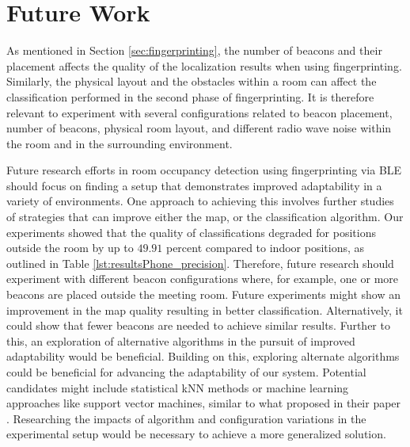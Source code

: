 \chapter{Future Work}
As mentioned in Section \ref{sec:fingerprinting}, the number of beacons and their placement affects the quality of the localization results when using fingerprinting. 
Similarly, the physical layout and the obstacles within a room can affect the classification performed in the second phase of fingerprinting. 
It is therefore relevant to experiment with several configurations related to beacon placement, number of beacons, physical room layout, and different radio wave noise within the room and in the surrounding environment. 

Future research efforts in room occupancy detection using fingerprinting via BLE should focus on finding a setup that demonstrates improved adaptability in a variety of environments.
One approach to achieving this involves further studies of strategies that can improve either the map, or the classification algorithm.
Our experiments showed that the quality of classifications degraded for positions outside the room by up to $49.91$ percent compared to indoor positions, as outlined in Table \ref{lst:resultsPhone_precision}. Therefore, future research should experiment with different beacon configurations where, for example, one or more beacons are placed outside the meeting room. 
Future experiments might show an improvement in the map quality resulting in better classification. Alternatively, it could show that fewer beacons are needed to achieve similar results. 
Further to this, an exploration of alternative algorithms in the pursuit of improved adaptability would be beneficial.
Building on this, exploring alternate algorithms could be beneficial for advancing the adaptability of our system.
Potential candidates might include statistical kNN methods or machine learning approaches like support vector machines, similar to what \citeauthor{ble_kneares_neural} proposed in their paper \cite{ble_kneares_neural}. 
Researching the impacts of algorithm and configuration variations in the experimental setup would be necessary to achieve a more generalized solution.


